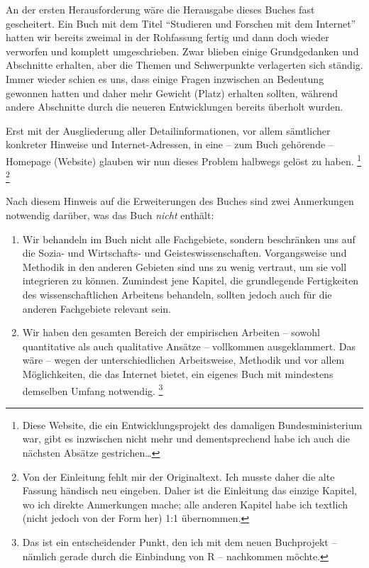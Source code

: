 \documentclass[]{book}
\providecommand{\tightlist}{%
  \setlength{\itemsep}{0pt}\setlength{\parskip}{0pt}}
\let\rmarkdownfootnote\footnote%
\def\footnote{\protect\rmarkdownfootnote}
\theoremstyle{definition}
\theoremstyle{definition}
\theoremstyle{definition}
\theoremstyle{remark}
\begin{document}
An der ersten Herausforderung wäre die Herausgabe dieses Buches fast
gescheitert. Ein Buch mit dem Titel ``Studieren und Forschen mit dem
Internet'' hatten wir bereits zweimal in der Rohfassung fertig und dann
doch wieder verworfen und komplett umgeschrieben. Zwar blieben einige
Grundgedanken und Abschnitte erhalten, aber die Themen und Schwerpunkte
verlagerten sich ständig. Immer wieder schien es uns, dass einige Fragen
inzwischen an Bedeutung gewonnen hatten und daher mehr Gewicht (Platz)
erhalten sollten, während andere Abschnitte durch die neueren
Entwicklungen bereits überholt wurden.

Erst mit der Ausgliederung aller Detailinformationen, vor allem
sämtlicher konkreter Hinweise und Internet-Adressen, in eine -- zum Buch
gehörende -- Homepage (Website) glauben wir nun dieses Problem halbwegs
gelöst zu haben. \footnote{Diese Website, die ein Entwicklungsprojekt
  des damaligen Bundesministerium war, gibt es inzwischen nicht mehr und
  dementsprechend habe ich auch die nächsten Absätze gestrichen\ldots{}}
\footnote{Von der Einleitung fehlt mir der Originaltext. Ich musste
  daher die alte Fassung händisch neu eingeben. Daher ist die Einleitung
  das einzige Kapitel, wo ich direkte Anmerkungen mache; alle anderen
  Kapitel habe ich textlich (nicht jedoch von der Form her) 1:1
  übernommen.}

Nach diesem Hinweis auf die Erweiterungen des Buches sind zwei
Anmerkungen notwendig darüber, was das Buch \emph{nicht} enthält:

\begin{enumerate}
\def\labelenumi{\arabic{enumi}.}
\tightlist
\item
  Wir behandeln im Buch nicht alle Fachgebiete, sondern beschränken uns
  auf die Sozia- und Wirtschafts- und Geisteswissenschaften.
  Vorgangsweise und Methodik in den anderen Gebieten sind uns zu wenig
  vertraut, um sie voll integrieren zu können. Zumindest jene Kapitel,
  die grundlegende Fertigkeiten des wissenschaftlichen Arbeitens
  behandeln, sollten jedoch auch für die anderen Fachgebiete relevant
  sein.
\item
  Wir haben den gesamten Bereich der empirischen Arbeiten -- sowohl
  quantitative als auch qualitative Ansätze -- vollkommen ausgeklammert.
  Das wäre -- wegen der unterschiedlichen Arbeitsweise, Methodik und vor
  allem Möglichkeiten, die das Internet bietet, ein eigenes Buch mit
  mindestens demselben Umfang notwendig. \footnote{Das ist ein
    entscheidender Punkt, den ich mit dem neuen Buchprojekt -- nämlich
    gerade durch die Einbindung von R -- nachkommen möchte.}
\end{enumerate}
\end{document}
